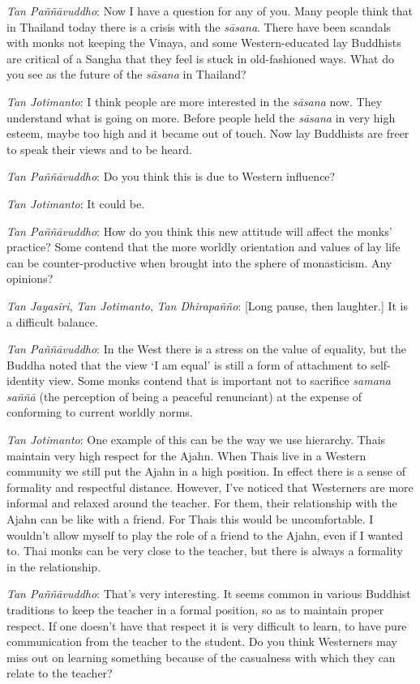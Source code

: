 \emph{Tan Paññāvuddho}‎: Now I have a question for any of you. Many
people think that in Thailand today there is a crisis with the
\emph{sāsana}. There have been scandals with monks not keeping the
Vinaya, and some Western-educated lay Buddhists are critical of a Sangha
that they feel is stuck in old-fashioned ways. What do you see as the
future of the \emph{sāsana} in Thailand?

\emph{Tan Jotimanto}: I think people are more interested in the
\emph{sāsana} now. They understand what is going on more. Before people
held the \emph{sāsana} in very high esteem, maybe too high and it became
out of touch. Now lay Buddhists are freer to speak their views and to be
heard.

\emph{Tan Paññāvuddho}‎: Do you think this is due to Western influence?

\emph{Tan Jotimanto}: It could be.

\emph{Tan Paññāvuddho}‎: How do you think this new attitude will affect
the monks' practice? Some contend that the more worldly orientation and
values of lay life can be counter-productive when brought into the
sphere of monasticism. Any opinions?

\emph{Tan Jayasiri}, \emph{Tan Jotimanto}, \emph{Tan Dhirapañño}‎:
{[}Long pause, then laughter.{]} It is a difficult balance.

\emph{Tan Paññāvuddho}‎: In the West there is a stress on the value of
equality, but the Buddha noted that the view `I am equal' is still a
form of attachment to self-identity view. Some monks contend that is
important not to sacrifice \emph{samana saññā} (the perception of being
a peaceful renunciant) at the expense of conforming to current worldly
norms.

\emph{Tan Jotimanto}: One example of this can be the way we use
hierarchy. Thais maintain very high respect for the Ajahn. When Thais
live in a Western community we still put the Ajahn in a high position.
In effect there is a sense of formality and respectful distance.
However, I've noticed that Westerners are more informal and relaxed
around the teacher. For them, their relationship with the Ajahn can be
like with a friend. For Thais this would be uncomfortable. I wouldn't
allow myself to play the role of a friend to the Ajahn, even if I wanted
to. Thai monks can be very close to the teacher, but there is always a
formality in the relationship.

\emph{Tan Paññāvuddho}‎: That's very interesting. It seems common in
various Buddhist traditions to keep the teacher in a formal position, so
as to maintain proper respect. If one doesn't have that respect it is
very difficult to learn, to have pure communication from the teacher to
the student. Do you think Westerners may miss out on learning something
because of the casualness with which they can relate to the teacher?

